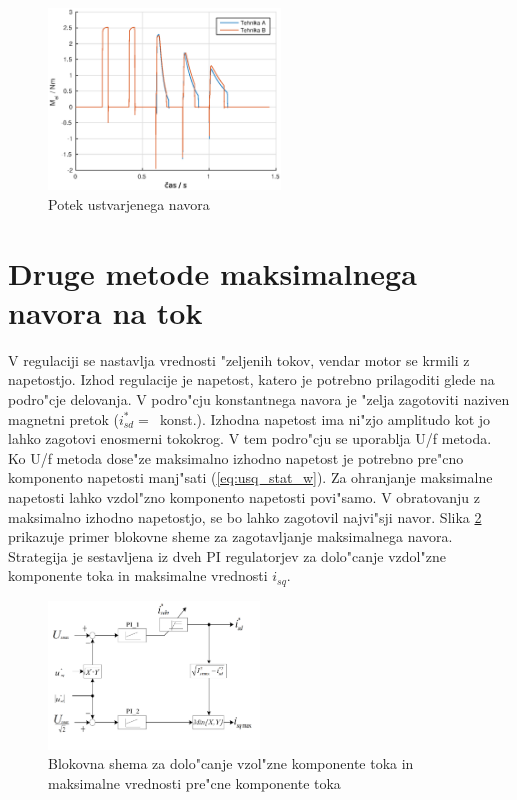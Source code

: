 \documentclass[journal,a4paper,twoside]{sty/IEEEtran}
\begin{document}
\begin{figure}
\includegraphics[width=0.55\textwidth]{fig_Mel.eps}
\caption{Potek ustvarjenega navora}
\label{fig:Mel}
\end{figure}

\section{Druge metode maksimalnega navora na tok}

V regulaciji se nastavlja vrednosti "zeljenih tokov, vendar motor se krmili z napetostjo. Izhod regulacije je napetost, katero je potrebno prilagoditi glede na  podro"cje delovanja. V podro"cju konstantnega navora je "zelja zagotoviti naziven magnetni pretok ($i_{sd}^*=$~konst.).
Izhodna napetost ima ni"zjo amplitudo kot jo lahko zagotovi enosmerni tokokrog. V tem podro"cju se uporablja U/f metoda. \cite{servopogoni} Ko U/f metoda dose"ze maksimalno izhodno napetost je potrebno pre"cno komponento napetosti manj"sati (\ref{eq:usq_stat_w}). Za ohranjanje maksimalne napetosti lahko vzdol"zno komponento napetosti povi"samo. V obratovanju z maksimalno izhodno napetostjo, se bo lahko zagotovil najvi"sji navor. Slika \ref{fig:MTPA_strategy} prikazuje primer blokovne sheme za zagotavljanje maksimalnega navora. Strategija je sestavljena iz dveh PI regulatorjev za dolo"canje vzdol"zne komponente toka in maksimalne vrednosti $i_{sq}$.

\begin{figure}
\includegraphics[width=0.5\textwidth]{MTPA_prva.png}
\caption{Blokovna shema za dolo"canje vzol"zne komponente toka in maksimalne vrednosti pre"cne komponente toka\cite{MTPA}}
\label{fig:MTPA_strategy}
\end{figure}
\end{document}
